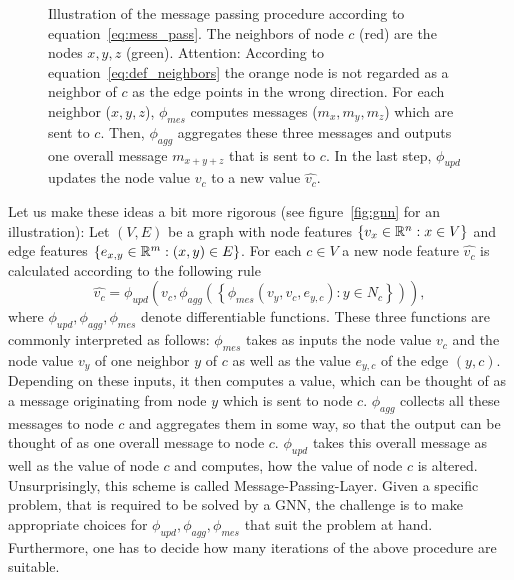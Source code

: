 \begin{SCfigure}[1][ht]
\caption{Illustration of the message passing procedure according to equation~\eqref{eq:mess_pass}. 
The neighbors of node $c$ (red) are the nodes $x,y,z$ (green). Attention: According to equation~\eqref{eq:def_neighbors} the orange node is not regarded as a neighbor of $c$ as the edge points in the wrong direction.
For each neighbor ($x,y,z$), $\phi_{mes}$ computes messages ($m_x,m_y,m_z$) which are sent to $c$.
Then, $\phi_{agg}$ aggregates these three messages and outputs one overall message $m_{x+y+z}$ that is sent to $c$. 
In the last step, $\phi_{upd}$ updates the node value $v_c$ to a new value $\widehat{v_c}$.  
}
\end{SCfigure}
Let us make these ideas a bit more rigorous (see figure~\ref{fig:gnn} for an illustration):  
Let $(V,E)$ be a graph with node features $\{v_x\in\mathbb{R}^n : x\in V\}$ and edge features $\{e_{x,y}\in\mathbb{R}^m:(x,y)\in E\}$.
For each $c\in V$ a new node feature $\widehat{v_c}$ is calculated according to the following rule
\begin{equation}
    \label{eq:mess_pass}
    \widehat{v_c}=\phi_{upd}\left(
        v_c, \phi_{agg}\left(\left\{
            \phi_{mes}\left(v_y,v_c, e_{y,c}\right):y\in N_c
            \right\}\right)
    \right),
\end{equation}
where $\phi_{upd},\phi_{agg},\phi_{mes}$ denote differentiable functions. These three functions are commonly interpreted as follows:
$\phi_{mes}$ takes as inputs the node value $v_c$ and the node value $v_y$ of one neighbor $y$ of $c$ as well as the value $e_{y,c}$ of the edge $(y,c)$. 
Depending on these inputs, it then computes a value, which can be thought of as a message originating from node $y$ which is sent to node $c$.
$\phi_{agg}$ collects all these messages to node $c$ and aggregates them in some way, so that the output can be thought of as one overall message to node $c$.
$\phi_{upd}$ takes this overall message as well as the value of node $c$ and computes, how the value of node $c$ is altered.
Unsurprisingly, this scheme is called Message-Passing-Layer. Given a specific problem, that is required to be solved by a GNN, the challenge is to make appropriate choices
for $\phi_{upd},\phi_{agg},\phi_{mes}$ that suit the problem at hand. Furthermore, one has to decide how many iterations of the above procedure are suitable.